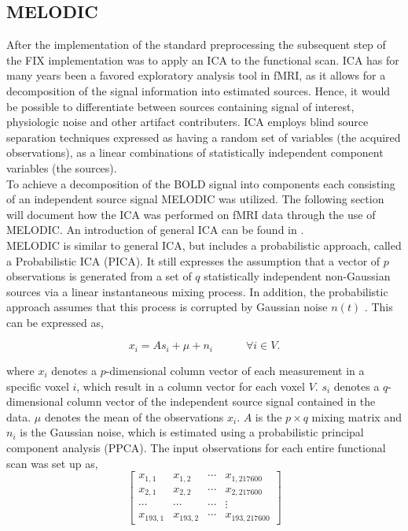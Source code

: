 \subsection{MELODIC}

After the implementation of the standard preprocessing the subsequent step of the FIX implementation was to apply an ICA to the functional scan. ICA has for many years been a favored exploratory analysis tool in fMRI, as it allows for a decomposition of the signal information into estimated sources. Hence, it would be possible to differentiate between sources containing signal of interest, physiologic noise and other artifact contributers. ICA employs blind source separation techniques expressed as having a random set of variables (the acquired observations), as a linear combinations of statistically independent component variables (the sources). \cite{Beckmann2004} \\
To achieve a decomposition of the BOLD signal into components each consisting of an independent source signal MELODIC was utilized. The following section will document how the ICA was performed on fMRI data through the use of MELODIC. An introduction of general ICA can be found in . \\
MELODIC is similar to general ICA, but includes a probabilistic approach, called a Probabilistic ICA (PICA). It still expresses the assumption that a vector of $p$ observations is generated from a set of $q$ statistically independent non-Gaussian sources via a linear instantaneous mixing process. In addition, the probabilistic approach assumes that this process is corrupted by Gaussian noise $n(t)$ \cite{Beckmann2004}. This can be expressed as, 

\begin{equation}
x_i = As_i + \mu + n_i  \hspace{3em} \forall i \in V.
\end{equation}     

where $x_i$ denotes a $p$-dimensional column vector of each measurement in a specific voxel $i$, which result in a column vector for each voxel $V$. $s_i$ denotes a $q$-dimensional column vector of the independent source signal contained in the data. $\mu$ denotes the mean of the observations $x_i$. $A$ is the $p\times q$ mixing matrix and $n_i$ is the Gaussian noise, which is estimated using a probabilistic principal component analysis (PPCA). The input observations for each entire functional scan was set up as,
\begin{equation}
 \begin{bmatrix}
x_{1,1} & x_{1,2} & \cdots & x_{1,217600} \\
x_{2,1} & x_{2,2} & \cdots & x_{2,217600} \\
\cdots & \cdots & \cdots & \vdots \\
x_{193,1} & x_{193,2} & \cdots & x_{193,217600} 
\end{bmatrix}  
\end{equation}

